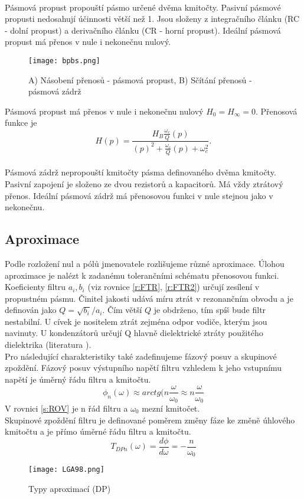 \\
Pásmová propust propouští pásmo určené dvěma kmitočty. Pasivní pásmové propusti nedosahují účinnosti větší než 1. Jsou složeny z integračního článku (RC - dolní propust) a derivačního článku (CR - horní propust). Ideální pásmová propust má přenos v nule i nekonečnu nulový. \\
\begin{figure}[h]
\centering
\texttt{[image: bpbs.png]}
\caption[A) Násobení přenosů - pásmová propust, B) Sčítání přenosů - pásmová zádrž]{A) Násobení přenosů - pásmová propust, B) Sčítání přenosů - pásmová zádrž \cite{8}}
\end{figure}
\noindent Pásmová propust má přenos v nule i nekonečnu nulový $H_{0} = H_{\infty} = 0$. Přenosová funkce je
\begin{equation}
H(p) = \frac{H_{B} \frac{\omega _c}{Q} (p) }{(p)^2 + \frac{\omega _c}{Q}(p) + \omega _c ^2}.
\end{equation}
\\
Pásmová zádrž nepropouští kmitočty pásma definovaného dvěma kmitočty. Pasivní zapojení je složeno ze dvou rezistorů a kapacitorů. Má vždy ztrátový přenos. Ideální pásmová zádrž má přenosovou funkci v nule stejnou jako v nekonečnu. \\
\subsection{Aproximace}
Podle rozložení nul a pólů jmenovatele rozlišujeme různé aproximace. Úlohou aproximace je nalézt k zadanému tolerančními schématu přenosovou funkci. Koeficienty filtru $a_i, b_i$ (viz rovnice \ref{r:FTR}, \ref{r:FTR2}) určují zesílení v propustném pásmu. Činitel jakosti udává míru ztrát v rezonančním obvodu a je definován jako $Q = \sqrt{b_i}/a_i$. Čím větší $Q$ je obdrženo, tím spíš bude filtr nestabilní. U cívek je nositelem ztrát zejména odpor vodiče, kterým jsou navinuty. U kondenzátorů určují Q hlavně dielektrické ztráty použitého dielektrika (literatura \cite{6}).\\
Pro následující charakteristiky také zadefinujeme fázový posuv a skupinové zpoždění. Fázový posuv výstupního napětí filtru vzhledem k jeho vstupnímu napětí je úměrný řádu filtru a kmitočtu.
\begin{equation}
\phi _n(\omega) \approx arctg(n \frac{\omega}{\omega _0} \approx n \frac{\omega}{\omega _0} \label{s:ROV}
\end{equation}
V rovnici \ref{s:ROV} je n řád filtru a $\omega _0$ mezní kmitočet.\\
Skupinové zpoždění filtru je definované poměrem změny fáze ke změně úhlového kmitočtu a je přímo úměrné řádu filtru a kmitočtu.\\
\begin{equation}
T _{DPn}(\omega) = \frac{d\phi}{d\omega} = - \frac{n}{\omega _0}
\end{equation}
\begin{figure}[h]
\centering
\texttt{[image: LGA98.png]}
\caption[Typy aproximací (DP)]{Typy aproximací (DP)\cite{9}}
\end{figure}
